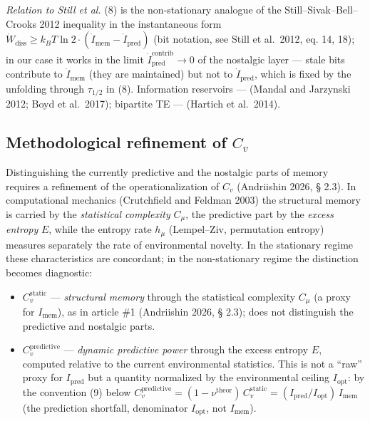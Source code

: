 \documentclass[pdflatex,sn-mathphys-ay]{sn-jnl}
\providecommand{\tightlist}{\setlength{\itemsep}{0pt}\setlength{\parskip}{0pt}}
\begin{document}
\emph{Relation to Still et al.} (8) is the non-stationary analogue of the Still--Sivak--Bell--Crooks 2012 inequality in the instantaneous form \(\dot W_{\text{diss}} \ge k_B T \ln 2 \cdot (\dot I_{\text{mem}} - \dot I_{\text{pred}})\) (bit notation, see Still et al.~2012, eq. 14, 18); in our case it works in the limit \(\dot I_{\text{pred}}^{\text{contrib}} \to 0\) of the nostalgic layer --- stale bits contribute to \(\dot I_{\text{mem}}\) (they are maintained) but not to \(\dot I_{\text{pred}}\), which is fixed by the unfolding through \(\tau_{1/2}\) in (8). Information reservoirs --- (Mandal and Jarzynski 2012; Boyd et al.~2017); bipartite TE --- (Hartich et al.~2014).



\subsection{\texorpdfstring{Methodological refinement of \(C_v\)}{Methodological refinement of C\_v}}\label{methodological-refinement-of-c_v}



Distinguishing the currently predictive and the nostalgic parts of memory requires a refinement of the operationalization of \(C_v\) (Andriishin 2026, § 2.3). In computational mechanics (Crutchfield and Feldman 2003) the structural memory is carried by the \emph{statistical complexity} \(C_\mu\), the predictive part by the \emph{excess entropy} \(E\), while the entropy rate \(h_\mu\) (Lempel--Ziv, permutation entropy) measures separately the rate of environmental novelty. In the stationary regime these characteristics are concordant; in the non-stationary regime the distinction becomes diagnostic:



\begin{itemize}

\tightlist

\item

  \(C_v^{\text{static}}\) --- \emph{structural memory} through the statistical complexity \(C_\mu\) (a proxy for \(I_{\text{mem}}\)), as in article \#1 (Andriishin 2026, § 2.3); does not distinguish the predictive and nostalgic parts.

\item

  \(C_v^{\text{predictive}}\) --- \emph{dynamic predictive power} through the excess entropy \(E\), computed relative to the current environmental statistics. This is not a ``raw'' proxy for \(I_{\text{pred}}\) but a quantity normalized by the environmental ceiling \(I_{\text{opt}}\): by the convention (9) below \(C_v^{\text{predictive}} = (1-\nu^{\text{theor}})\,C_v^{\text{static}} = (I_{\text{pred}}/I_{\text{opt}})\,I_{\text{mem}}\) (the prediction shortfall, denominator \(I_{\text{opt}}\), not \(I_{\text{mem}}\)).

\end{itemize}
\end{document}
